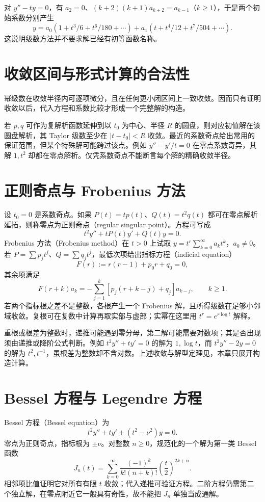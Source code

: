 \documentclass[UTF8,12pt,a4paper,fontset=fandol]{ctexbook}
\begin{document}
对 $y''-ty=0$，有 $a_2=0$、$(k+2)(k+1)a_{k+2}=a_{k-1}$（$k\geq1$），于是两个初始系数分别产生
\[
 y=a_0(1+t^3/6+t^6/180+\cdots)+a_1(t+t^4/12+t^7/504+\cdots).
\]
这说明级数方法并不要求解已经有初等函数名称。

\section{收敛区间与形式计算的合法性}
幂级数在收敛半径内可逐项微分，且在任何更小闭区间上一致收敛。因而只有证明收敛以后，代入方程和系数比较才形成一个完整解的构造。

若 $p,q$ 可作为复解析函数延伸到以 $t_0$ 为中心、半径 $R$ 的圆盘，则对应初值解在该圆盘解析，其 Taylor 级数至少在 $|t-t_0|<R$ 收敛。最近的系数奇点给出常用的保证范围，但某个特殊解可能跨过该点。例如 $y''-y'/t=0$ 在零点系数奇异，其解 $1,t^2$ 却都在零点解析。仅凭系数奇点不能断言每个解的精确收敛半径。

\section{正则奇点与 Frobenius 方法}
设 $t_0=0$ 是系数奇点。如果 $P(t)=tp(t)$、$Q(t)=t^2q(t)$ 都可在零点解析延拓，则称零点为正则奇点（regular singular point）。方程可写成
\[
 t^2y''+tP(t)y'+Q(t)y=0.
\]
Frobenius 方法（Frobenius method）在 $t>0$ 上试取 $y=t^r\sum_{k=0}^\infty a_kt^k$，$a_0\ne0$。若 $P=\sum p_jt^j$、$Q=\sum q_jt^j$，最低次项给出指标方程（indicial equation）
\[
 F(r):=r(r-1)+p_0r+q_0=0,
\]
其余项满足
\[
 F(r+k)a_k=-\sum_{j=1}^k[p_j(r+k-j)+q_j]a_{k-j},\qquad k\geq1.
\]
若两个指标根之差不是整数，各根产生一个 Frobenius 解，且所得级数在足够小邻域收敛。复根可在复数中计算再取实部与虚部；实幂在这里用 $t^r=e^{r\log t}$ 解释。

重根或根差为整数时，递推可能遇到零分母，第二解可能需要对数项；其是否出现须由递推或降阶公式判断。例如 $t^2y''+ty'=0$ 的解为 $1,\log t$，而 $t^2y''-2y=0$ 的解为 $t^2,t^{-1}$，虽根差为整数却不含对数。上述收敛与解型定理见\cite[第4章]{teschl-ode}，本章只展开构造计算。

\section{Bessel 方程与 Legendre 方程}
Bessel 方程（Bessel equation）为
\[
 t^2y''+ty'+(t^2-\nu^2)y=0.
\]
零点为正则奇点，指标根为 $\pm\nu$。对整数 $n\geq0$，规范化的一个解为第一类 Bessel 函数
\[
 J_n(t)=\sum_{k=0}^\infty\frac{(-1)^k}{k!(n+k)!}\left(\frac t2\right)^{2k+n}.
\]
相邻项比值证明它对所有有限 $t$ 收敛；代入递推可验证方程。二阶方程仍需第二个独立解，在零点附近它一般具有奇性，故不能把 $J_n$ 单独当成通解。
\end{document}

